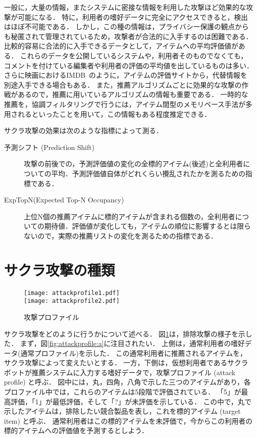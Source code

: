 一般に，大量の情報，またシステムに密接な情報を利用した攻撃ほど効果的な攻撃が可能になる．
特に，利用者の嗜好データに完全にアクセスできると，検出はほぼ不可能である．
しかし，この種の情報は，プライバシー保護の観点からも秘匿されて管理されているため，攻撃者が合法的に入手するのは困難である．
比較的容易に合法的に入手できるデータとして，アイテムへの平均評価値がある．
これらのデータを公開しているシステムや，利用者そのものでなくても，コメントを付けている編集者や利用者の評価の平均値を出しているものは多い．
さらに映画におけるIMDB~\cite{url:021}のように，アイテムの評価サイトから，代替情報を別途入手できる場合もある．
また，推薦アルゴリズムごとに効果的な攻撃の作戦があるので，推薦に用いているアルゴリズムの情報も重要である．
一時的な推薦を，協調フィルタリングで行うには，アイテム間型のメモリベース手法が多用されるといったことを用いて，この情報もある程度推定できる．

サクラ攻撃の効果は次のような指標によって測る．
\begin{description}
\item[予測シフト (Prediction Shift)] 攻撃の前後での，予測評価値の変化の全標的アイテム(後述)と全利用者についての平均．予測評価値自体がどれくらい攪乱されたかを測るための指標である．
\item[ExpTopN(Expected Top-N Occupancy)] 上位N個の推薦アイテムに標的アイテムが含まれる個数の，全利用者についての期待値．評価値が変化しても，アイテムの順位に影響するとは限らないので，実際の推薦リストの変化を測るための指標である．
\end{description}

\section{サクラ攻撃の種類}
\label{sec:shilling:tactics}

\begin{figure}
\centering
{}%
{\texttt{[image: attackprofile1.pdf]}}\\\bigskip
{}%
{\texttt{[image: attackprofile2.pdf]}}
\caption{攻撃プロファイル}
\label{fig:attackprofile}
\end{figure}

サクラ攻撃をどのように行うかについて述べる\cite{www:04:01}．
図\ref{fig:attackprofile}は，排除攻撃の様子を示した．
まず，図\ref{fig:attackprofile:a}に注目されたい．
上側は，通常利用者の嗜好データ(通常プロファイル)を示した．
この通常利用者に推薦されるアイテムを，サクラ攻撃によって変えたいとする．
一方，下側は，仮想利用者であるサクラボットが推薦システムに入力する嗜好データで，攻撃プロファイル (attack profile) と呼ぶ．
図中には，丸，四角，八角で示した三つのアイテムがあり，各プロファイル中では，これらのアイテムは5段階で評価されている．
「5」が最高評価，「1」が最低評価，そして「?」が未評価を示している．
この中で，丸で示したアイテムは，排除したい競合製品を表し，これを標的アイテム (target item) と呼ぶ．
通常利用者はこの標的アイテムを未評価で，今からこの利用者の標的アイテムへの評価値を予測するとしよう．

